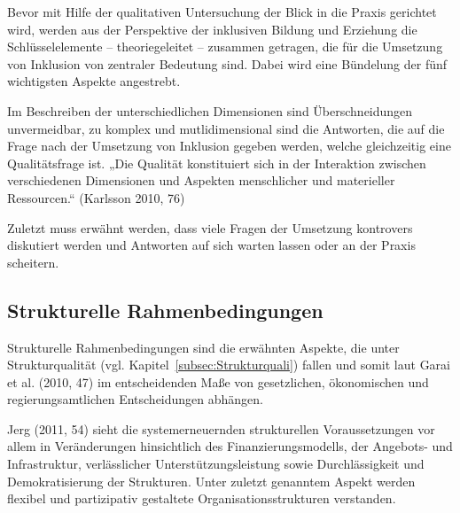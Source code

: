 Bevor mit Hilfe der qualitativen Untersuchung der Blick in die Praxis gerichtet wird, werden aus der Perspektive der inklusiven Bildung und Erziehung die Schlüsselelemente -- theoriegeleitet -- zusammen getragen, die für die Umsetzung von Inklusion von zentraler Bedeutung sind.
Dabei wird eine Bündelung der fünf wichtigsten Aspekte angestrebt.

Im Beschreiben der unterschiedlichen Dimensionen sind Überschneidungen unvermeidbar, zu komplex und mutlidimensional sind die Antworten, die auf die Frage nach der Umsetzung von Inklusion gegeben werden, welche  gleichzeitig eine Qualitätsfrage ist.  
„Die Qualität konstituiert sich in der Interaktion zwischen verschiedenen Dimensionen und Aspekten menschlicher und materieller Ressourcen.“ (Karlsson 2010, 76)

Zuletzt muss erwähnt werden, dass viele Fragen der Umsetzung kontrovers diskutiert werden und Antworten auf sich warten lassen oder an der Praxis scheitern.  

\subsection{Strukturelle Rahmenbedingungen}\label{Strukturelle Rahmenbedingungen}

Strukturelle Rahmenbedingungen sind die erwähnten Aspekte, die unter Strukturqualität (vgl. Kapitel~\ref{subsec:Strukturquali}) fallen und somit laut Garai et al. (2010, 47) im entscheidenden Maße von gesetzlichen, ökonomischen und regierungsamtlichen Entscheidungen abhängen.

Jerg (2011, 54) sieht die systemerneuernden strukturellen Voraussetzungen vor allem in Veränderungen hinsichtlich des Finanzierungsmodells, der Angebots- und Infrastruktur, verlässlicher Unterstützungsleistung sowie Durchlässigkeit und Demokratisierung der Strukturen. Unter zuletzt genanntem Aspekt werden flexibel und partizipativ gestaltete Organisationsstrukturen verstanden. 

